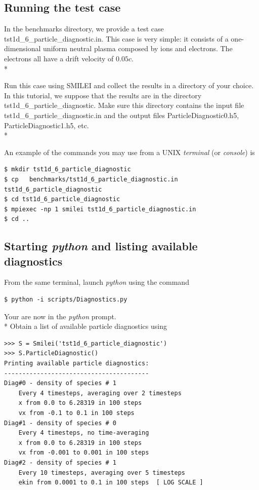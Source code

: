 \documentclass[11pt]{article}
\newcommand{\code}[1]{\colorbox{yellow!15}{\ttfamily #1}}
\begin{document}
\subsection{Running the test case}

In the \code{benchmarks} directory, we provide a test case \code{tst1d\_6\_particle\_diagnostic.in}. This case is very simple: it consists of a one-dimensional uniform neutral plasma composed by ions and electrons. The electrons all have a drift velocity of $0.05c$.\\*

Run this case using SMILEI and collect the results in a directory of your choice. In this tutorial, we suppose that the results are in the directory \code{tst1d\_6\_particle\_diagnostic}. Make sure this directory contains the input file \code{tst1d\_6\_particle\_diagnostic.in} and the output files \code{ParticleDiagnostic0.h5}, \code{ParticleDiagnostic1.h5}, etc.\\*

An example of the commands you may use from a UNIX \textit{terminal} (or \textit{console}) is
\begin{lstlisting}
$ mkdir tst1d_6_particle_diagnostic
$ cp   benchmarks/tst1d_6_particle_diagnostic.in    tst1d_6_particle_diagnostic
$ cd tst1d_6_particle_diagnostic
$ mpiexec -np 1 smilei tst1d_6_particle_diagnostic.in
$ cd ..
\end{lstlisting}

\subsection{Starting \textit{python} and listing available diagnostics}

From the same terminal, launch \textit{python} using the command
\begin{lstlisting}
$ python -i scripts/Diagnostics.py
\end{lstlisting}

Your are now in the \textit{python} prompt.\\*
Obtain a list of available particle diagnostics using
\begin{lstlisting}
>>> S = Smilei('tst1d_6_particle_diagnostic')
>>> S.ParticleDiagnostic()
Printing available particle diagnostics:
----------------------------------------
Diag#0 - density of species # 1 
    Every 4 timesteps, averaging over 2 timesteps
    x from 0.0 to 6.28319 in 100 steps 
    vx from -0.1 to 0.1 in 100 steps 
Diag#1 - density of species # 0 
    Every 4 timesteps, no time-averaging
    x from 0.0 to 6.28319 in 100 steps 
    vx from -0.001 to 0.001 in 100 steps 
Diag#2 - density of species # 1 
    Every 10 timesteps, averaging over 5 timesteps
    ekin from 0.0001 to 0.1 in 100 steps  [ LOG SCALE ] 
\end{lstlisting}
\end{document}
